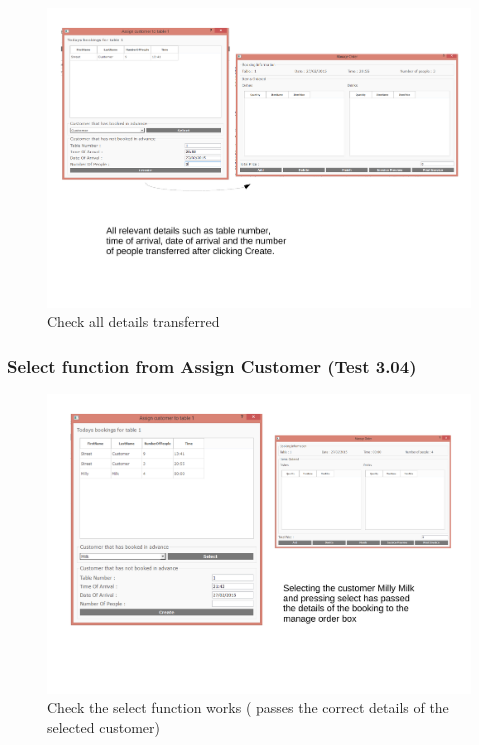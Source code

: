 \begin{landscape}
\begin{figure}[H]
    \includegraphics[width = 20cm]{./Testing/images/test5.pdf}
    \caption{Check all details transferred} \label{fig:Test5}
\end{figure}

\subsubsection{Select function from Assign Customer (Test 3.04)}

\begin{figure}[H]
    \includegraphics[width = 20cm]{./Testing/images/testt1.pdf}
    \caption{Check the select function works ( passes the correct details of the selected customer)} \label{fig:Test8}
\end{figure}


\end{landscape}
